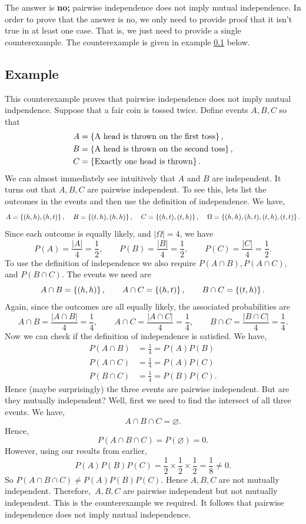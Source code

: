 \noindent The answer is \textbf{no;} pairwise independence does not imply mutual independence. In order to prove that the answer is no, we only need to provide proof that it isn't true in at least one case. That is, we just need to provide a single counterexample. The counterexample is given in example \ref{exmut} below.

\subsection{Example} \label{exmut} 
This counterexample proves that pairwise independence does not imply mutual indpendence. Suppose that a fair coin is tossed twice. Define events $A, B, C$ so that
\begin{align*}
A & = \left\{\text{A head is thrown on the first toss}\right\}, \\
B & = \left\{\text{A head is thrown on the second toss}\right\}, \\
C & = \left\{\text{Exactly one head is thrown}\right\}.
\end{align*}
We can almost immediately see intuitively that $A$ and $B$ are independent. It turns out that $A,B,C$ are pairwise independent. To see this, lets list the outcomes in the events and then use the definition of independence. We have,
\[
A = \left\{(h,h),(h,t)\right\}, \;\;\;\; B = \left\{(t,h),(h,h)\right\}, \;\;\;\; C = \left\{(h,t),(t,h)\right\}, \;\;\;\; \Omega = \left\{(h,h),(h,t),(t,h),(t,t)\right\}.
\]
Since each outcome is equally likely, and $|\Omega| = 4$, we have
\[
P(A) = \frac{|A|}{4} = \frac{1}{2}, \qquad P(B) = \frac{|B|}{4} = \frac{1}{2}, \qquad P(C) = \frac{|C|}{4} = \frac{1}{2}.
\]
To use the definition of independence we also require $P(A \cap B), P(A \cap C),$ and $P(B \cap C)$. The events we need are
\[
A \cap B = \left\{(h,h)\right\}, \qquad A \cap C = \left\{(h,t)\right\}, \qquad B \cap C = \left\{(t,h)\right\}.
\] 
Again, since the outcomes are all equally likely, the associated probabilities are
\[
A \cap B = \frac{|A \cap B|}{4} = \frac{1}{4}, \qquad A \cap C = \frac{|A \cap C|}{4} = \frac{1}{4}, \qquad B \cap C = \frac{|B \cap C|}{4} = \frac{1}{4}.
\]
Now we can check if the definition of independence is satisfied. We have,
\begin{align*}
P(A \cap B) & = \frac{1}{4} = P(A)P(B) \\
P(A \cap C) & = \frac{1}{4} = P(A)P(C) \\
P(B \cap C) & = \frac{1}{4} = P(B)P(C).
\end{align*}
Hence (maybe surprisingly) the three events are pairwise independent. But are they mutually independent? Well, first we need to find the intersect of all three events. We have,
\[
A \cap B \cap C = \varnothing.
\]
Hence,
\[
P(A \cap B \cap C) = P(\varnothing) = 0. \tag{Consequence 3, p.measure axioms}
\]
However, using our results from earlier,
\[
P(A)P(B)P(C) = \frac{1}{2}\times\frac{1}{2}\times\frac{1}{2} = \frac{1}{8} \neq 0.
\]
So $P(A \cap B \cap C) \neq P(A)P(B)P(C)$. Hence $A,B,C$ are not mutually independent. Therefore,~$A,B,C$ are pairwise independent but not mutually independent. This is the counterexample we required. It follows that pairwise independence does not imply mutual independence.


